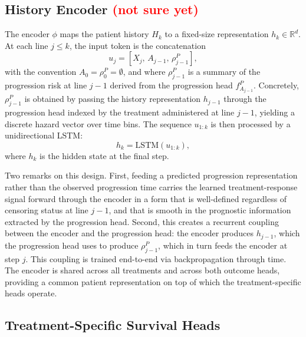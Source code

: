 \documentclass[a4paper,10pt]{article}
\begin{document}
\subsection{History Encoder \textcolor{red}{(not sure yet)} }

\label{sec:encoder}

The encoder $\phi$ maps the patient history $H_k$ to a fixed-size representation $h_k \in \mathbb{R}^d$. At each line $j \leq k$, the input token is the concatenation
\begin{equation}
    u_j = [X_j,\, A_{j-1},\, \rho^P_{j-1}],
\end{equation}
with the convention $A_0 = \rho^P_0 = \emptyset$, and where $\rho^P_{j-1}$ is a summary of the progression risk at line $j-1$ derived from the progression head $f^P_{A_{j-1}}$. Concretely, $\rho^P_{j-1}$ is obtained by passing the history representation $h_{j-1}$ through the progression head indexed by the treatment administered at line $j-1$, yielding a discrete hazard vector over time bins. The sequence $u_{1:k}$ is then processed by a unidirectional LSTM:
\begin{equation}
    h_k = \text{LSTM}(u_{1:k}),
\end{equation}
where $h_k$ is the hidden state at the final step.

Two remarks on this design. First, feeding a predicted progression representation rather than the observed progression time carries the learned treatment-response signal forward through the encoder in a form that is well-defined regardless of censoring status at line $j-1$, and that is smooth in the prognostic information extracted by the progression head. Second, this creates a recurrent coupling between the encoder and the progression head: the encoder produces $h_{j-1}$, which the progression head uses to produce $\rho^P_{j-1}$, which in turn feeds the encoder at step $j$. This coupling is trained end-to-end via backpropagation through time. The encoder is shared across all treatments and across both outcome heads, providing a common patient representation on top of which the treatment-specific heads operate.

\subsection{Treatment-Specific Survival Heads}
\label{sec:survival-heads}
\end{document}
